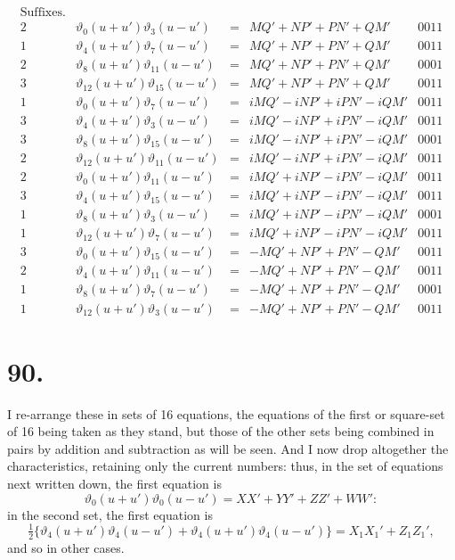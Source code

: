 \documentclass[11pt,a4paper]{article}
\newcommand{\uth}[1]{\vartheta_{#1}}
\begin{document}
\[
\begin{array}{ccccc}
\text{Suffixes.} & & & & \\
\hline
2 & \uth{0}(u+u')\uth{3}(u-u') &=& MQ' + NP' + PN' + QM' & 0011 \\
1 & \uth{4}(u+u')\uth{7}(u-u') &=& MQ' + NP' + PN' + QM' & 0011 \\
2 & \uth{8}(u+u')\uth{11}(u-u') &=& MQ' + NP' + PN' + QM' & 0001 \\
3 & \uth{12}(u+u')\uth{15}(u-u') &=& MQ' + NP' + PN' + QM' & 0011 \\
\hline
1 & \uth{0}(u+u')\uth{7}(u-u') &=& iMQ' - iNP' + iPN' - iQM' & 0011 \\
3 & \uth{4}(u+u')\uth{3}(u-u') &=& iMQ' - iNP' + iPN' - iQM' & 0011 \\
3 & \uth{8}(u+u')\uth{15}(u-u') &=& iMQ' - iNP' + iPN' - iQM' & 0001 \\
2 & \uth{12}(u+u')\uth{11}(u-u') &=& iMQ' - iNP' + iPN' - iQM' & 0011 \\
\hline
2 & \uth{0}(u+u')\uth{11}(u-u') &=& iMQ' + iNP' - iPN' - iQM' & 0011 \\
3 & \uth{4}(u+u')\uth{15}(u-u') &=& iMQ' + iNP' - iPN' - iQM' & 0011 \\
1 & \uth{8}(u+u')\uth{3}(u-u') &=& iMQ' + iNP' - iPN' - iQM' & 0001 \\
1 & \uth{12}(u+u')\uth{7}(u-u') &=& iMQ' + iNP' - iPN' - iQM' & 0011 \\
\hline
3 & \uth{0}(u+u')\uth{15}(u-u') &=& -MQ' + NP' + PN' - QM' & 0011 \\
2 & \uth{4}(u+u')\uth{11}(u-u') &=& -MQ' + NP' + PN' - QM' & 0011 \\
1 & \uth{8}(u+u')\uth{7}(u-u') &=& -MQ' + NP' + PN' - QM' & 0001 \\
1 & \uth{12}(u+u')\uth{3}(u-u') &=& -MQ' + NP' + PN' - QM' & 0011
\end{array}
\]

\newpage
\section*{90.}
\label{sec:90}

I re-arrange these in sets of 16 equations, the equations of the first or square-set of 16 being taken as they stand, but those of the other sets being combined in pairs by addition and subtraction as will be seen. And I now drop altogether the characteristics, retaining only the current numbers: thus, in the set of equations next written down, the first equation is
\[
\uth{0}(u+u')\uth{0}(u-u') = XX' + YY' + ZZ' + WW':
\]
in the second set, the first equation is
\[
\tfrac{1}{2}\{\uth{4}(u+u')\uth{4}(u-u') + \uth{4}(u+u')\uth{4}(u-u')\} = X_1X_1' + Z_1Z_1',
\]
and so in other cases.
\end{document}
